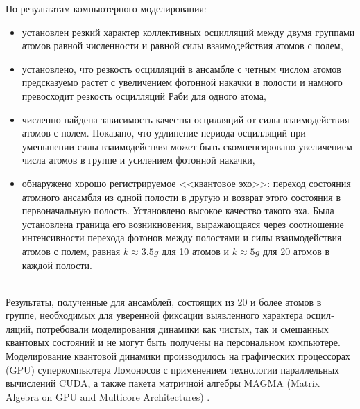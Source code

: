 По результатам компьютерного моделирования:
\begin{itemize}
	\item{установлен резкий характер коллективных осцилляций между двумя группами атомов равной численности и равной силы взаимодействия атомов с полем,}
	\item{установлено, что резкость осцилляций в ансамбле с четным числом атомов предсказуемо растет с увеличением фотонной накачки в полости и намного превосходит резкость осцилляций Раби для одного атома},
	\item{численно найдена зависимость качества осцилляций от силы взаимодействия атомов с полем. Показано, что удлинение периода осцилляций при уменьшении силы взаимодействия может быть скомпенсировано увеличением числа атомов в группе и усилением фотонной накачки,}
	\item{обнаружено хорошо регистрируемое <<квантовое эхо>>: переход состояния атомного ансамбля из одной полости в другую и возврат этого
состояния в первоначальную полость. Установлено высокое качество такого эха. Была установлена граница его возникновения, выражающаяся через соотношение интенсивности перехода фотонов между полостями и силы взаимодействия атомов с полем, равная $k \approx 3.5g$ для 10 атомов и $k \approx 5g$ для 20 атомов в каждой полости.}
\end{itemize}
\
\\
\indent Результаты, полученные для ансамблей, состоящих из 20 и более атомов в группе, необходимых для уверенной фиксации выявленного характера осцил­ляций, потребовали моделирования динамики как чистых, так и смешанных квантовых состояний и не могут быть получены на персональном компью­тере. Моделирование квантовой динамики производилось на графических процессорах (GPU) суперкомпьютера Ломоносов с применением технологии па­раллельных вычислений CUDA, а также пакета матричной алгебры MAGMA (Matrix Algebra on GPU and Multicore Architectures) \cite{magma}.

